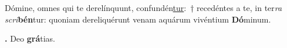 
Dómine, omnes qui te derelínquunt, confundén\underline{tur}:~† recedéntes a te, in ter\textit{ra scri}\textbf{bén}tur: quoniam dereliquérunt venam aquárum vivéntium \textbf{Dó}minum.

\textbf{\Rbar.} Deo \textbf{grá}tias.

